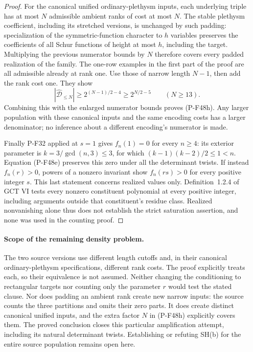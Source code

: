 \documentclass[11pt,a4paper]{article}
\begin{document}
\begin{proof}
For the canonical unified ordinary-plethysm inputs,
each underlying triple has at most $N$ admissible
ambient ranks of cost at most $N$.
The stable plethysm coefficient, including its stretched
versions, is unchanged by such padding: specialization
of the symmetric-function character to $h$ variables
preserves the coefficients of all Schur functions of
height at most $h$, including the target.
Multiplying the previous numerator bounds by $N$
therefore covers every padded realization of the family.
The one-row examples in the first part of the proof
are all admissible already at rank one.
Use those of narrow length $N-1$, then add the rank
cost one. They show
\[
        |\widehat{\mathcal D}_{\le N}|
                  \ge 2^{(N-1)/2-4}
                  \ge 2^{N/2-5}
                         \qquad(N\ge13).
\]
Combining this with the enlarged numerator bounds
proves (P-F48h). Any larger population with these
canonical inputs and the same encoding costs has a
larger denominator; no inference about a different
encoding's numerator is made.

Finally P-F32 applied at $s=1$ gives
$f_n(1)=0$ for every $n\ge4$: its exterior parameter
is $k=3/\gcd(n,3)\le3$, for which
$(k-1)(k-2)/2\le1<n$.
Equation (P-F48e) preserves this zero under all the
determinant twists.
If instead $f_n(r)>0$, powers of a nonzero invariant
show $f_n(rs)>0$ for every positive integer $s$.
This last statement concerns realized values only.
Definition~1.2.4 of GCT VI tests every nonzero
constituent polynomial at every positive integer,
including arguments outside that constituent's
residue class. Realized nonvanishing alone thus
does not establish the strict saturation assertion,
and none was used in the counting proof.
\end{proof}

\paragraph{Scope of the remaining density problem.}
The two source versions use different length cutoffs
and, in their canonical ordinary-plethysm specifications,
different rank costs. The proof explicitly treats
each, so their equivalence is not assumed.
Neither changing the conditioning to
rectangular targets nor counting only the parameter
$r$ would test the stated clause. Nor does padding an
ambient rank create new narrow inputs: the source
counts the three partitions and omits their zero parts.
It does create distinct canonical unified inputs,
and the extra factor $N$ in (P-F48h) explicitly covers
them.
The proved conclusion closes this particular
amplification attempt, including its natural determinant
twists. Establishing or refuting SH(b) for the entire
source population remains open here.
\end{document}
